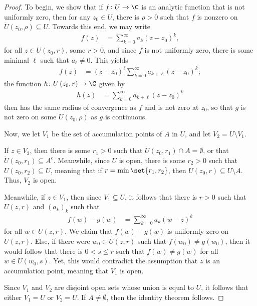 \documentclass[10pt]{mypackage}
\begin{document}
\begin{proof}
  To begin, we show that if $f\colon U\rightarrow \C$ is an analytic function that is not uniformly zero, then for any $z_0\in U$, there is $\rho > 0$ such that $f$ is nonzero on $\dot{U}\left( z_0,\rho \right)\subseteq U$. Towards this end, we may write
  \begin{align*}
    f(z) &= \sum_{k=0}^{\infty}a_k\left( z-z_0 \right)^{k},
  \end{align*}
  for all $z\in U\left( z_0,r \right)$, some $r > 0$, and since $f$ is not uniformly zero, there is some minimal $\ell$ such that $a_{\ell}\neq 0$. This yields
  \begin{align*}
    f(z) &= \left( z-z_0 \right)^{\ell}\sum_{k=0}^{\infty}a_{k + \ell}\left( z-z_0 \right)^{k};
  \end{align*}
  the function $h\colon U\left( z_0,r \right)\rightarrow \C$ given by
  \begin{align*}
    h(z) &= \sum_{k=0}^{\infty}a_{k + \ell}\left( z-z_0 \right)^{k}
  \end{align*}
  then has the same radius of convergence as $f$ and is not zero at $z_0$, so that $g$ is not zero on some $U\left( z_0,\rho \right)$ as $g$ is continuous.%

  Now, we let $V_1$ be the set of accumulation points of $A$ in $U$, and let $V_2 = U\setminus V_1$.%

  If $z\in V_2$, then there is some $r_1 > 0$ such that $\dot{U}\left( z_0,r_1 \right)\cap A = \emptyset$, or that $\dot{U}\left( z_0,r_1 \right) \subseteq A^{c}$. Meanwhile, since $U$ is open, there is some $r_2 > 0$ such that $U\left( z_0,r_2 \right)\subseteq U$, meaning that if $r = \min\set{r_1,r_2}$, then $U\left( z_0,r \right) \subseteq U\setminus A$. Thus, $V_2$ is open.%

  Meanwhile, if $z\in V_1$, then since $V_1\subseteq U$, it follows that there is $r > 0$ such that $U\left( z,r \right)$ and $\left( a_k \right)_k$ such that
  \begin{align*}
    f(w)- g(w) &= \sum_{k=0}^{\infty}a_k\left( w-z \right)^{k}
  \end{align*}
  for all $w\in U\left( z,r \right)$. We claim that $f(w) - g(w)$ is uniformly zero on $U\left( z,r \right)$. Else, if there were $w_0\in U\left( z,r \right)$ such that $f\left( w_0 \right)\neq g\left( w_0 \right)$, then it would follow that there is $0 < s\leq r$ such that $f(w)\neq g(w)$ for all $w\in \dot{U}\left( w_0,s \right)$. Yet, this would contradict the assumption that $z$ is an accumulation point, meaning that $V_1$ is open.%

  Since $V_1$ and $V_2$ are disjoint open sets whose union is equal to $U$, it follows that either $V_1 = U$ or $V_2 = U$. If $A \neq \emptyset$, then the identity theorem follows.
\end{proof}
\end{document}

